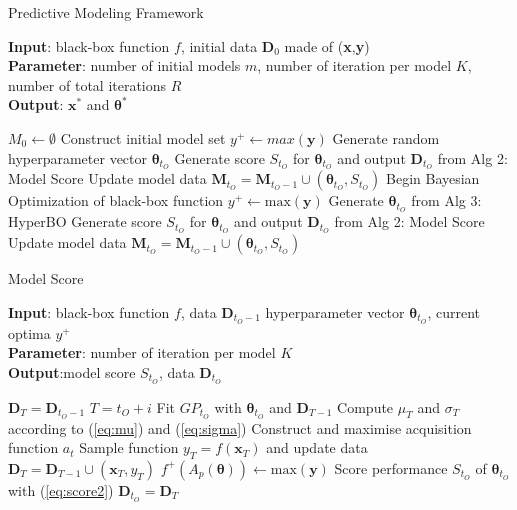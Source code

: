 \begin{algorithm}[t]
	\caption{Predictive Modeling Framework}
	\label{alg:AMMSF}
	\textbf{Input}: black-box function $f$, initial data $\boldsymbol{D}_0$ made of (\textbf{x},\textbf{y})\\
	\textbf{Parameter}: number of initial models $m$, number of iteration per model $K$, number of total iterations $R$\\
	\textbf{Output}: $\boldsymbol{x}^{*}$ and $\boldsymbol{\theta}^{*}$
	\begin{algorithmic}[1] %
		\STATE $M_0 \gets \emptyset$
		\STATE Construct initial model set
		\STATE $y^{+} \leftarrow max(\boldsymbol{y})$
		\STATE Generate random hyperparameter vector $\boldsymbol{\theta}_{t_{O}}$
		\STATE Generate score $S_{t_{O}}$ for $\boldsymbol{\theta}_{t_{O}}$ and output $\boldsymbol{D}_{t_{O}}$ from Alg 2: Model Score
		\STATE Update model data $\boldsymbol{M}_{t_{O}}=\boldsymbol{M}_{t_{O}-1} \cup (\boldsymbol{\theta}_{t_{O}},S_{t_{O}})$
		\ENDFOR
		\STATE Begin Bayesian Optimization of black-box function
		\STATE $y^{+} \leftarrow \text{max}(\boldsymbol{y})$
		\STATE Generate $\boldsymbol{\theta}_{t_{O}}$ from Alg 3: HyperBO
		\STATE Generate score $S_{t_{O}}$ for $\boldsymbol{\theta}_{t_{O}}$ and output $\boldsymbol{D}_{t_{O}}$ from Alg 2: Model Score
		\STATE Update model data $\boldsymbol{M}_{t_{O}}=\boldsymbol{M}_{t_{O}-1} \cup (\boldsymbol{\theta}_{t_{O}},S_{t_{O}})$
		\ENDWHILE
	\end{algorithmic}
\end{algorithm}
\begin{algorithm}
	\caption{Model Score}
	\label{alg:ScoringModel}
	\textbf{Input}: black-box function $f$, data $\boldsymbol{D}_{t_{O}-1}$ hyperparameter vector $\boldsymbol{\theta}_{t_{O}}$, current optima $y^{+}$\\
	\textbf{Parameter}: number of iteration per model $K$\\
	\textbf{Output}:model score $S_{t_{O}}$, data $\boldsymbol{D}_{t_{O}}$
	\begin{algorithmic}[1]
		\STATE $\boldsymbol{D}_{T} = \boldsymbol{D}_{t_{O}-1}$
		\STATE $T = t_{O}+i$
		\STATE Fit $GP_{t_{O}}$ with $\boldsymbol{\theta}_{t_{O}}$ and $\boldsymbol{D}_{T-1}$
		\STATE Compute $\mu_{T}$ and $\sigma_{T}$ according to (\ref{eq:mu}) and (\ref{eq:sigma})
		\STATE Construct and maximise acquisition function $a_{t}$
		\STATE Sample function $y_{T} = f(\boldsymbol{x}_{T})$ and update data $\boldsymbol{D}_{T} = \boldsymbol{D}_{{T}-1} \cup (\boldsymbol{x}_{T},y_{T})$
		\ENDFOR
		\STATE $f^{+}(A_p(\boldsymbol{\theta})) \leftarrow \text{max}(\boldsymbol{y})$
		\STATE Score performance $S_{t_{O}}$ of $\boldsymbol{\theta}_{t_{O}}$ with (\ref{eq:score2})
		\STATE $\boldsymbol{D}_{t_O} = \boldsymbol{D}_{T}$
	\end{algorithmic}
\end{algorithm}
